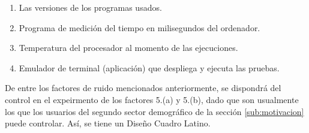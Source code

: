 \documentclass[11pt,a4paper]{article}
\begin{document}
\begin{enumerate}
\begin{enumerate}
\begin{multicols}{3}
				\begin{enumerate}
					\item Procesador.
					\item Memoria RAM.
					\item Tarjeta Gráfica.
				\end{enumerate}
				\end{multicols} \vspace{-3mm}
			\item Las versiones de los programas usados.
			\item Programa de medición del tiempo en milisegundos del ordenador.
			\item Temperatura del procesador al momento de las ejecuciones.
			\item Emulador de terminal (aplicación) que despliega y ejecuta las pruebas.
		\end{enumerate}
\end{enumerate}
De entre los factores de ruido mencionados anteriormente, se dispondrá del control en el expeirmento de los factores 5.(a) y 5.(b), dado que son usualmente los que los usuarios del segundo sector demográfico de la sección \ref{sub:motivacion} puede controlar.
Así, se tiene un Diseño Cuadro Latino.
\end{document}
